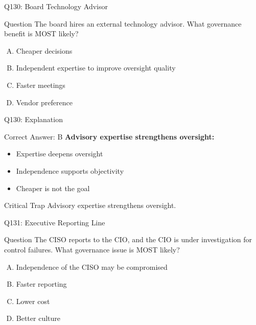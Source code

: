 \documentclass{beamer}
\begin{document}
	\begin{frame}{Q130: Board Technology Advisor}
		\begin{block}{Question}
			The board hires an external technology advisor. What governance benefit is MOST likely?
		\end{block}
		\begin{enumerate}[(A)]
			\item Cheaper decisions
			\item Independent expertise to improve oversight quality
			\item Faster meetings
			\item Vendor preference
		\end{enumerate}
	\end{frame}
	
	\begin{frame}{Q130: Explanation}
		\begin{block}{Correct Answer: B}
			\textbf{Advisory expertise strengthens oversight:}
			\begin{itemize}
				\item Expertise deepens oversight
				\item Independence supports objectivity
				\item Cheaper is not the goal
			\end{itemize}
		\end{block}
		\begin{alertblock}{Critical Trap}
			Advisory expertise strengthens oversight.
		\end{alertblock}
	\end{frame}
	
	\begin{frame}{Q131: Executive Reporting Line}
		\begin{block}{Question}
			The CISO reports to the CIO, and the CIO is under investigation for control failures. What governance issue is MOST likely?
		\end{block}
		\begin{enumerate}[(A)]
			\item Independence of the CISO may be compromised
			\item Faster reporting
			\item Lower cost
			\item Better culture
		\end{enumerate}
	\end{frame}
	
\end{document}
